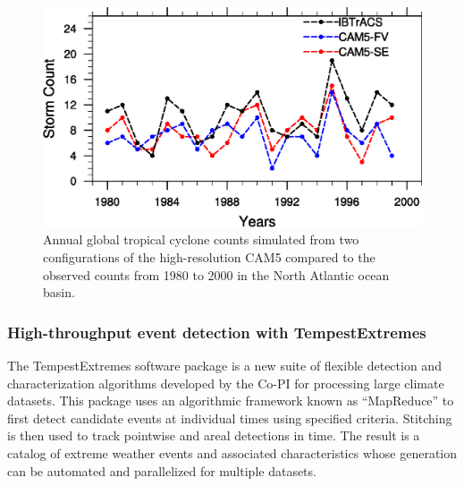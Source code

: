 \documentclass[11pt]{article}
\begin{document}
\begin{figure}[h]
\begin{center}
\includegraphics[width=5.in]{NA_interannual.eps}
\end{center}
\caption{Annual global tropical cyclone counts simulated from two configurations of the high-resolution CAM5 compared to the observed counts from 1980 to 2000 in the North Atlantic ocean basin.} \label{fig:NATCs}
\end{figure}

\subsubsection{High-throughput event detection with TempestExtremes} \label{sec:TempestExtremes}

The TempestExtremes software package is a new suite of flexible detection and characterization algorithms developed by the Co-PI for processing large climate datasets. This package uses an algorithmic framework known as ``MapReduce'' to first detect candidate events at individual times using specified criteria. Stitching is then used to track pointwise and areal detections in time. The result is a catalog of extreme weather events and associated characteristics whose generation can be automated and parallelized for multiple datasets.
\end{document}
